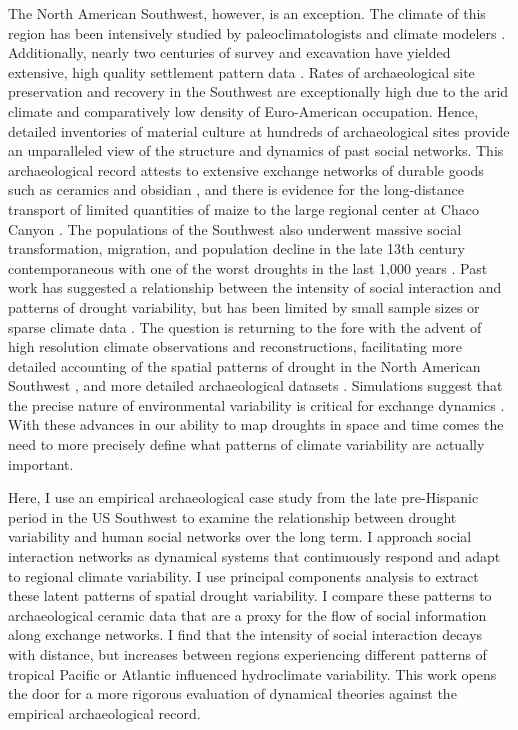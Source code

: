 \documentclass[10pt]{iopart}
\begin{document}
The North American Southwest, however, is an exception. The climate of this region has been intensively studied by paleoclimatologists and climate modelers \parencite{Cook1999,Sheppard2002,McCabe2004,Herweijer2007a, Cook2011,Bocinsky2014, Coats2015a, Routson2016, Ault2018}. Additionally, nearly two centuries of survey and excavation have yielded extensive, high quality settlement pattern data \parencite{Hill2004}. Rates of archaeological site preservation and recovery in the Southwest are exceptionally high due to the arid climate and comparatively low density of Euro-American occupation. Hence, detailed inventories of material culture at hundreds of archaeological sites provide an unparalleled view of the structure and dynamics of past social networks. This archaeological record attests to extensive exchange networks of durable goods such as ceramics and obsidian \parencite{Malville2001,Taliaferro2010,Mills2013a}, and there is evidence for the long-distance transport of limited quantities of maize to the large regional center at Chaco Canyon \parencite{Benson2009,Benson2010}. The populations of the Southwest also underwent massive social transformation, migration, and population decline in the late 13th century contemporaneous with one of the worst droughts in the last 1,000 years \parencite{Hill2004}. Past work has suggested a relationship between the intensity of social interaction and patterns of drought variability, but has been limited by small sample sizes or sparse climate data \parencite{Rautman1993a,Johnson1990ChumashAnalysis,Cordell2007}. The question is returning to the fore with the advent of high resolution climate observations and reconstructions, facilitating more detailed accounting of the spatial patterns of drought in the North American Southwest \parencite{Strawhacker2017RiskProvince}, and more detailed archaeological datasets \parencite{Borck2015}. Simulations suggest that the precise nature of environmental variability is critical for exchange dynamics \parencite{Freeman2014}. With these advances in our ability to map droughts in space and time comes the need to more precisely define what patterns of climate variability are actually important.

Here, I use an empirical archaeological case study from the late pre-Hispanic period in the US Southwest to examine the relationship between drought variability and human social networks over the long term. I approach social interaction networks as dynamical systems that continuously respond and adapt to regional climate variability. I use principal components analysis to extract these latent patterns of spatial drought variability. I compare these patterns to archaeological ceramic data that are a proxy for the flow of social information along exchange networks. I find that the intensity of social interaction decays with distance, but increases between regions experiencing different patterns of tropical Pacific or Atlantic influenced hydroclimate variability. This work opens the door for a more rigorous evaluation of dynamical theories against the empirical archaeological record.
\end{document}
